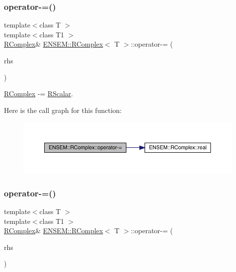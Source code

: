 \subsubsection{\texorpdfstring{operator-\/=()}{operator-=()}\hspace{0.1cm}{\footnotesize\ttfamily [2/4]}}
{\footnotesize\ttfamily template$<$class T $>$ \\
template$<$class T1 $>$ \\
\mbox{\hyperlink{classENSEM_1_1RComplex}{R\+Complex}}\& \mbox{\hyperlink{classENSEM_1_1RComplex}{E\+N\+S\+E\+M\+::\+R\+Complex}}$<$ T $>$\+::operator-\/= (\begin{DoxyParamCaption}\item[{const \mbox{\hyperlink{classENSEM_1_1RScalar}{R\+Scalar}}$<$ T1 $>$ \&}]{rhs }\end{DoxyParamCaption})\hspace{0.3cm}{\ttfamily [inline]}}



\mbox{\hyperlink{classENSEM_1_1RComplex}{R\+Complex}} -\/= \mbox{\hyperlink{classENSEM_1_1RScalar}{R\+Scalar}}. 

Here is the call graph for this function\+:
\nopagebreak
\begin{figure}[H]
\begin{center}
\leavevmode
\includegraphics[width=350pt]{d9/d0e/classENSEM_1_1RComplex_af071c8c8f4d2a2cf17a9e4b01accf6bc_cgraph}
\end{center}
\end{figure}
\mbox{\label{classENSEM_1_1RComplex_aa2ad7391f0a0df5381ae7402b8b1fdb8}} 
\subsubsection{\texorpdfstring{operator-\/=()}{operator-=()}\hspace{0.1cm}{\footnotesize\ttfamily [3/4]}}
{\footnotesize\ttfamily template$<$class T $>$ \\
template$<$class T1 $>$ \\
\mbox{\hyperlink{classENSEM_1_1RComplex}{R\+Complex}}\& \mbox{\hyperlink{classENSEM_1_1RComplex}{E\+N\+S\+E\+M\+::\+R\+Complex}}$<$ T $>$\+::operator-\/= (\begin{DoxyParamCaption}\item[{const \mbox{\hyperlink{classENSEM_1_1RComplex}{R\+Complex}}$<$ T1 $>$ \&}]{rhs }\end{DoxyParamCaption})\hspace{0.3cm}{\ttfamily [inline]}}



